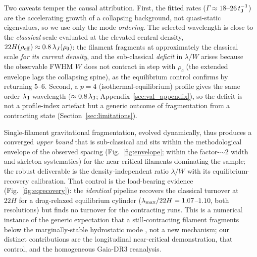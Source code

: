 \documentclass[usenatbib,twoside,twocolumn]{mnras}
\begin{document}
Two caveats temper the causal attribution. First, the fitted rates ($\Gamma\approx18$--$26\,t_{\rm J}^{-1}$) are the accelerating growth of a collapsing background, not quasi-static eigenvalues, so we use only the mode \emph{ordering}. The selected wavelength is close to the \emph{classical} scale evaluated at the elevated central density, $22H(\rho_{\rm eff})\approx0.8\,\lambda_J(\rho_0)$: the filament fragments at approximately the classical scale \emph{for its current density}, and the sub-classical \emph{deficit} in $\lambda/W$ arises because the observable FWHM $W$ does not contract in step with $\rho_c$ (the extended envelope lags the collapsing spine), as the equilibrium control confirms by returning $5$--$6$. Second, a $p=4$ (isothermal-equilibrium) profile gives the same order-$\lambda_{\rm J}$ wavelength ($\approx0.8\,\lambda_{\rm J}$; Appendix~\ref{sec:val_appendix}), so the deficit is not a profile-index artefact but a generic outcome of fragmentation from a contracting state (Section~\ref{sec:limitations}).

Single-filament gravitational fragmentation, evolved dynamically, thus produces a converged \emph{upper bound} that is sub-classical and sits within the methodological envelope of the observed spacing (Fig.~\ref{fig:envelope}; within the factor-$\sim$2 width and skeleton systematics) for the near-critical filaments dominating the sample; the robust deliverable is the density-independent ratio $\lambda/W$ with its equilibrium-recovery calibration. That control is the load-bearing evidence (Fig.~\ref{fig:eqrecovery}): the \emph{identical} pipeline recovers the classical turnover at $22H$ for a drag-relaxed equilibrium cylinder ($\lambda_{\rm max}/22H=1.07$--$1.10$, both resolutions) but finds no turnover for the contracting runs. This is a numerical instance of the generic expectation that a still-contracting filament fragments below the marginally-stable hydrostatic mode \citep{Clarke2016,Clarke2017,Clarke2020}, not a new mechanism; our distinct contributions are the longitudinal near-critical demonstration, that control, and the homogeneous Gaia-DR3 reanalysis.
\end{document}
